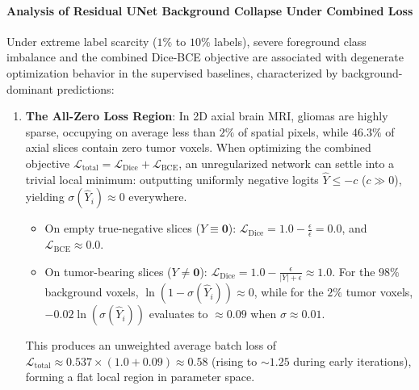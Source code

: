 \documentclass{article}
\begin{document}
\paragraph{Analysis of Residual UNet Background Collapse Under Combined Loss}
Under extreme label scarcity ($1\%$ to $10\%$ labels), severe foreground class imbalance and the combined Dice-BCE objective are associated with degenerate optimization behavior in the supervised baselines, characterized by background-dominant predictions:
\begin{enumerate}
    \item \textbf{The All-Zero Loss Region}: In 2D axial brain MRI, gliomas are highly sparse, occupying on average less than $2\%$ of spatial pixels, while $46.3\%$ of axial slices contain zero tumor voxels. When optimizing the combined objective $\mathcal{L}_{\text{total}} = \mathcal{L}_{\text{Dice}} + \mathcal{L}_{\text{BCE}}$, an unregularized network can settle into a trivial local minimum: outputting uniformly negative logits $\hat{Y} \le -c$ ($c \gg 0$), yielding $\sigma(\hat{Y}_i) \approx 0$ everywhere.
    \begin{itemize}
        \item On empty true-negative slices ($Y \equiv \mathbf{0}$): $\mathcal{L}_{\text{Dice}} = 1.0 - \frac{\epsilon}{\epsilon} = 0.0$, and $\mathcal{L}_{\text{BCE}} \approx 0.0$.
        \item On tumor-bearing slices ($Y \neq \mathbf{0}$): $\mathcal{L}_{\text{Dice}} = 1.0 - \frac{\epsilon}{|Y| + \epsilon} \approx 1.0$. For the $98\%$ background voxels, $\ln(1 - \sigma(\hat{Y}_i)) \approx 0$, while for the $2\%$ tumor voxels, $-0.02 \ln(\sigma(\hat{Y}_i))$ evaluates to $\approx 0.09$ when $\sigma \approx 0.01$.
    \end{itemize}
    This produces an unweighted average batch loss of $\mathcal{L}_{\text{total}} \approx 0.537 \times (1.0 + 0.09) \approx 0.58$ (rising to $\sim 1.25$ during early iterations), forming a flat local region in parameter space.
    

\end{enumerate}
\end{document}
